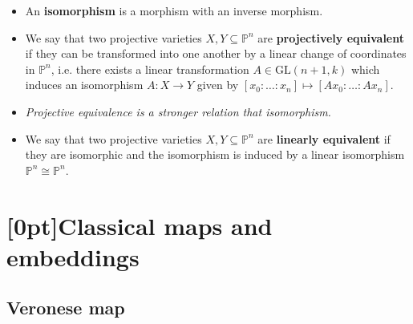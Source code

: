 \documentclass[10pt]{article}
\newcommand{\pee}{\mathbb{P}}
\newcommand{\AG}{\textcolor{green}{AG}}
\begin{document}
\begin{itemize}
            \item An \textbf{isomorphism} is a morphism with an inverse morphism.
            \item We say that two projective varieties $X,Y\subseteq\pee^n$ are \textbf{projectively equivalent} if they can be transformed into one another by a linear change of coordinates in $\pee^n$, i.e. there exists a linear transformation $A\in\mathrm{GL}(n+1,k)$ which induces an isomorphism $A\colon X\to Y$ given by $[x_0:\ldots:x_n]\mapsto[Ax_0:\ldots:Ax_n]$.
            \item \emph{Projective equivalence is a stronger relation that isomorphism.}
            \item We say that two projective varieties $X,Y\subseteq\pee^n$ are \textbf{linearly equivalent} if they are isomorphic and the isomorphism is induced by a linear isomorphism $\pee^n\cong\pee^n$.
        \end{itemize}

    \section{\protect\marginnote{\AG}[0pt]Classical maps and embeddings}

        \subsection{Veronese map}
        
\end{document}
